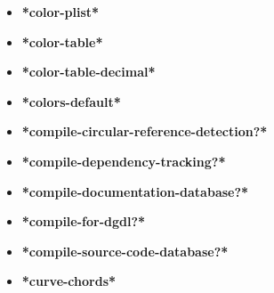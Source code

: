 \documentclass [11pt]{book}
\begin{document}
\begin{itemize}

\item {}
\label{prim:*color-plist*}
\textbf{*color-plist*}





\item {}
\label{prim:*color-table*}
\textbf{*color-table*}





\item {}
\label{prim:*color-table-decimal*}
\textbf{*color-table-decimal*}





\item {}
\label{prim:*colors-default*}
\textbf{*colors-default*}





\item {}
\label{prim:*compile-circular-reference-detection?*}
\textbf{*compile-circular-reference-detection?*}





\item {}
\label{prim:*compile-dependency-tracking?*}
\textbf{*compile-dependency-tracking?*}





\item {}
\label{prim:*compile-documentation-database?*}
\textbf{*compile-documentation-database?*}





\item {}
\label{prim:*compile-for-dgdl?*}
\textbf{*compile-for-dgdl?*}





\item {}
\label{prim:*compile-source-code-database?*}
\textbf{*compile-source-code-database?*}





\item {}
\label{prim:*curve-chords*}
\textbf{*curve-chords*}






\end{itemize}
\end{document}
